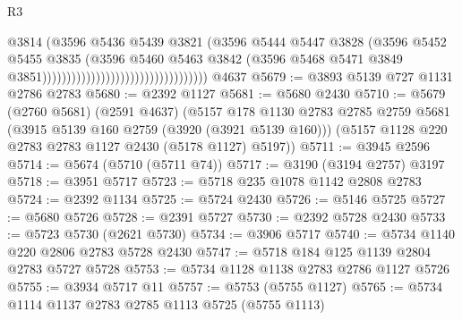 \begin{lexlean}{R3}
\begin{coremodule}
                                                              @3814
                                                              (@3596
                                                                @5436
                                                                @5439
                                                                @3821
                                                                (@3596
                                                                  @5444
                                                                  @5447
                                                                  @3828
                                                                  (@3596
                                                                    @5452
                                                                    @5455
                                                                    @3835
                                                                    (@3596
                                                                      @5460
                                                                      @5463
                                                                      @3842
                                                                      (@3596
                                                                        @5468
                                                                        @5471
                                                                        @3849
                                                                        @3851))))))))))))))))))))))))))))))))))
    @4637
@5679 := @3893 @5139 @727 @1131 @2786 @2783
@5680 := @2392 @1127
@5681 := @5680 @2430
@5710 := @5679
    (@2760 @5681)
    (@2591 @4637)
    (@5157
      @178
      @1130
      @2783
      @2785
      @2759
      @5681
      (@3915 @5139 @160 @2759 (@3920 (@3921 @5139 @160)))
      (@5157 @1128 @220 @2783 @2783 @1127 @2430 (@5178 @1127) @5197))
@5711 := @3945 @2596
@5714 := @5674 (@5710 (@5711 @74))
@5717 := @3190 (@3194 @2757) @3197
@5718 := @3951 @5717
@5723 := @5718 @235 @1078 @1142 @2808 @2783
@5724 := @2392 @1134
@5725 := @5724 @2430
@5726 := @5146 @5725
@5727 := @5680 @5726
@5728 := @2391 @5727
@5730 := @2392 @5728 @2430
@5733 := @5723 @5730 (@2621 @5730)
@5734 := @3906 @5717
@5740 := @5734 @1140 @220 @2806 @2783 @5728 @2430
@5747 := @5718 @184 @125 @1139 @2804 @2783 @5727 @5728
@5753 := @5734 @1128 @1138 @2783 @2786 @1127 @5726
@5755 := @3934 @5717 @11
@5757 := @5753 (@5755 @1127)
@5765 := @5734 @1114 @1137 @2783 @2785 @1113 @5725 (@5755 @1113)

\end{coremodule}
\end{lexlean}
